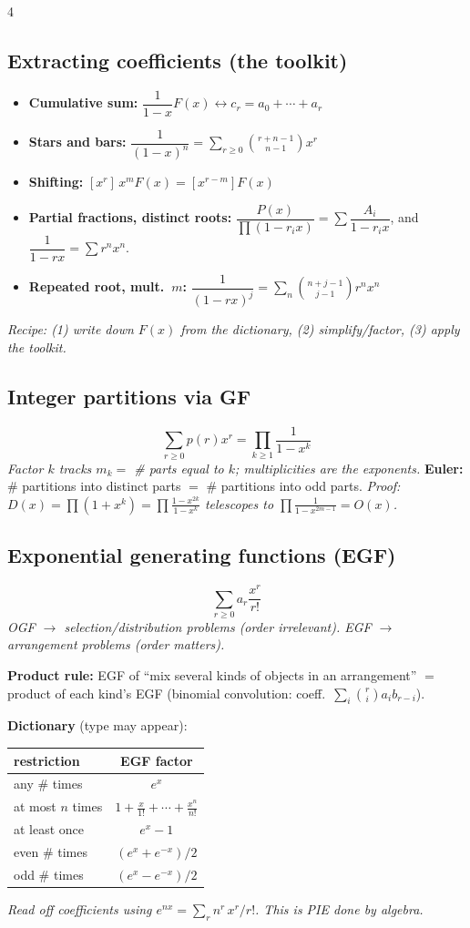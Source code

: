 \documentclass[8pt]{extarticle}
\newcommand{\note}[1]{{\footnotesize\color{gray!70!black}\emph{#1}}}
\begin{document}
\begin{multicols}{4}
\subsection*{Extracting coefficients (the toolkit)}
\begin{itemize}
\item \textbf{Cumulative sum:} $\dfrac{1}{1-x}F(x) \leftrightarrow c_r=a_0+\cdots+a_r$
\item \textbf{Stars and bars:} $\dfrac{1}{(1-x)^n}=\displaystyle\sum_{r\ge0}\binom{r+n-1}{n-1}x^r$
\item \textbf{Shifting:} $[x^r]\,x^mF(x)=[x^{r-m}]F(x)$
\item \textbf{Partial fractions, distinct roots:} $\dfrac{P(x)}{\prod(1-r_ix)}=\sum\dfrac{A_i}{1-r_ix}$, and $\dfrac1{1-rx}=\sum r^nx^n$.
\item \textbf{Repeated root, mult.\ $m$:} $\dfrac1{(1-rx)^j}=\sum_n\binom{n+j-1}{j-1}r^nx^n$
\end{itemize}
\note{Recipe: (1) write down $F(x)$ from the dictionary, (2) simplify/factor, (3) apply the toolkit.}

\subsection*{Integer partitions via GF}
\[ \sum_{r\ge0}p(r)x^r = \prod_{k\ge1}\frac{1}{1-x^k} \]
\note{Factor $k$ tracks $m_k=$ \# parts equal to $k$; multiplicities are the exponents.}
\textbf{Euler:} \# partitions into distinct parts $=$ \# partitions into odd parts.
\note{Proof: $D(x)=\prod(1+x^k)=\prod\frac{1-x^{2k}}{1-x^k}$ telescopes to $\prod\frac1{1-x^{2m-1}}=O(x)$.}

\subsection*{Exponential generating functions (EGF)}
\[ \sum_{r\ge0}a_r\frac{x^r}{r!} \]
\note{OGF $\to$ selection/distribution problems (order irrelevant). EGF $\to$ arrangement problems (order matters).}
\begin{key}
\textbf{Product rule:} EGF of ``mix several kinds of objects in an arrangement'' $=$ product of each kind's EGF (binomial convolution: coeff.\ $\sum_i\binom ri a_ib_{r-i}$).
\end{key}
\textbf{Dictionary} (type may appear):
\begin{tab}
\centering\renewcommand{\arraystretch}{1.5}
\begin{tabular}{@{}l c@{}}
\toprule
restriction & EGF factor \\ \midrule
any \# times & $e^x$ \\
at most $n$ times & $1+\frac{x}{1!}+\cdots+\frac{x^n}{n!}$ \\
at least once & $e^x-1$ \\
even \# times & $(e^x+e^{-x})/2$ \\
odd \# times & $(e^x-e^{-x})/2$ \\
\bottomrule
\end{tabular}
\end{tab}
\note{Read off coefficients using $e^{nx}=\sum_r n^r\,x^r/r!$. This is PIE done by algebra.}


\end{multicols}
\end{document}
